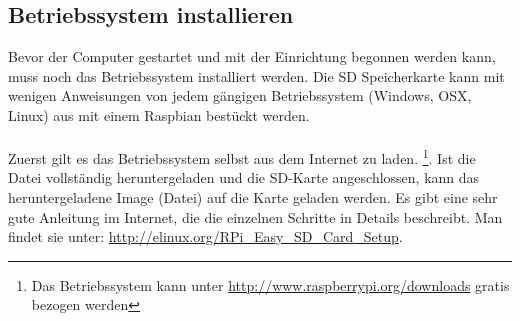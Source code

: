 \subsection{Betriebssystem installieren}
Bevor der Computer gestartet und mit der Einrichtung begonnen werden kann, muss noch das Betriebssystem installiert werden.
Die SD Speicherkarte kann mit wenigen Anweisungen von jedem gängigen Betriebssystem (Windows, OSX, Linux) aus mit einem Raspbian bestückt werden.
\\
\\
Zuerst gilt es das Betriebssystem selbst aus dem Internet zu laden.
\footnote{Das Betriebssystem kann unter \url{http://www.raspberrypi.org/downloads} gratis bezogen werden}.
Ist die Datei vollständig heruntergeladen und die SD-Karte angeschlossen, kann das heruntergeladene Image (Datei) auf die Karte geladen werden.
Es gibt eine sehr gute Anleitung im Internet, die die einzelnen Schritte in Details beschreibt. Man findet sie unter: \url{http://elinux.org/RPi\_Easy\_SD\_Card\_Setup}.
